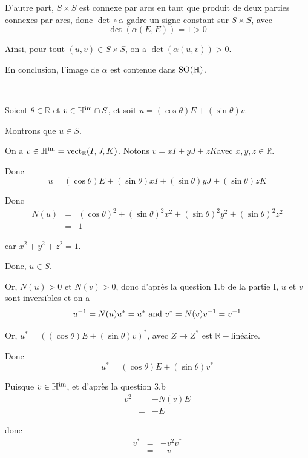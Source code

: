 D'autre part, $S \times S$ est connexe par arcs en tant que produit de deux
parties connexes par arcs, donc $\det \circ \alpha$ gadre un signe constant
sur $S \times S$, avec
\[ \det (\alpha (E, E)) = 1 > 0 \]


Ainsi, pour tout $(u, v) \in S \times S$, on a $\det (\alpha (u, v)) > 0$.

En conclusion, l'image de $\alpha$ est contenue dans $\operatorname{SO} (\mathbb{H})$.

\

 Soient $\theta \in \mathbb{R}$ et $v \in \mathbb{H}^{\operatorname{im}}
\cap S$, et soit $u = (\cos \theta) E + (\sin \theta) v$.

 Montrons que $u \in S$.

On a $v \in \mathbb{H}^{\operatorname{im}} = \operatorname{vect}_{\mathbb{R}} (I, J, K)$.
Notons $v = x I + y J + z K$avec $x, y, z \in \mathbb{R}$.

Donc
\[ u = (\cos \theta) E + (\sin \theta) x I + (\sin \theta) y J + (\sin \theta)
   z K \]


Donc
\begin{eqnarray*}
  N (u) & = & (\cos \theta)^2 + (\sin \theta)^2 x^2 + (\sin \theta)^2 y^2 +
  (\sin \theta)^2 z^2\\
  & = & 1
\end{eqnarray*}


car $x^2 + y^2 + z^2 = 1$.

Donc, $u \in S$.

Or, $N (u) > 0$ et $N (v) > 0$, donc d'apr{\`e}s la question 1.b de la partie
I, $u$ et $v$ sont inversibles et on a
\[ u^{- 1} = N (u) u^{\ast} = u^{\ast} \text{ and } v^{\ast} = N (v) v^{- 1} =
   v^{- 1} \]


Or, $u^{\ast} = ((\cos \theta) E + (\sin \theta) v)^{\ast}$, avec $Z
\rightarrow Z^{\ast}$ est $\mathbb{R}-$lin{\'e}aire.

Donc
\[ u^{\ast} = (\cos \theta) E + (\sin \theta) v^{\ast} \]


Puisque $v \in \mathbb{H}^{\operatorname{im}}$, et d'apr{\`e}s la question 3.b
\begin{eqnarray*}
  v^2 & = & - N (v) E\\
  & = & - E
\end{eqnarray*}


donc
\begin{eqnarray*}
  v^{\ast} & = & - v^2 v^{\ast}\\
  & = & - v
\end{eqnarray*}


